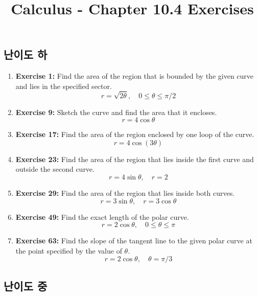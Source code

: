 \documentclass[12pt, a4paper]{article}
\title{Calculus - Chapter 10.4 Exercises}
\author{}
\date{}
\begin{document}
\maketitle
\hrulefill
\vspace{1em}

\subsection*{난이도 하}

\begin{enumerate}
    \item \textbf{Exercise 1:} Find the area of the region that is bounded by the given curve and lies in the specified sector.
    \[ r = \sqrt{2\theta}, \quad 0 \le \theta \le \pi/2 \]

    \item \textbf{Exercise 9:} Sketch the curve and find the area that it encloses.
    \[ r = 4\cos\theta \]

    \item \textbf{Exercise 17:} Find the area of the region enclosed by one loop of the curve.
    \[ r = 4\cos(3\theta) \]

    \item \textbf{Exercise 23:} Find the area of the region that lies inside the first curve and outside the second curve.
    \[ r = 4\sin\theta, \quad r = 2 \]

    \item \textbf{Exercise 29:} Find the area of the region that lies inside both curves.
    \[ r = 3\sin\theta, \quad r = 3\cos\theta \]

    \item \textbf{Exercise 49:} Find the exact length of the polar curve.
    \[ r = 2\cos\theta, \quad 0 \le \theta \le \pi \]

    \item \textbf{Exercise 63:} Find the slope of the tangent line to the given polar curve at the point specified by the value of $\theta$.
    \[ r = 2\cos\theta, \quad \theta = \pi/3 \]
\end{enumerate}

\hrulefill
\vspace{1em}

\subsection*{난이도 중}
\end{document}
